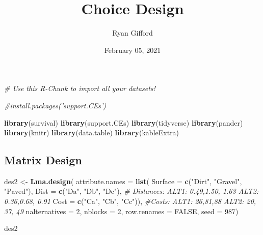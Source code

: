 \documentclass[
]{article}
\title{Choice Design}
\author{Ryan Gifford}
\date{February 05, 2021}
\newenvironment{Shaded}{\begin{snugshade}}{\end{snugshade}}
\newcommand{\CommentTok}[1]{\textcolor[rgb]{0.56,0.35,0.01}{\textit{#1}}}
\newcommand{\DataTypeTok}[1]{\textcolor[rgb]{0.13,0.29,0.53}{#1}}
\newcommand{\DecValTok}[1]{\textcolor[rgb]{0.00,0.00,0.81}{#1}}
\newcommand{\KeywordTok}[1]{\textcolor[rgb]{0.13,0.29,0.53}{\textbf{#1}}}
\newcommand{\NormalTok}[1]{#1}
\newcommand{\OtherTok}[1]{\textcolor[rgb]{0.56,0.35,0.01}{#1}}
\newcommand{\StringTok}[1]{\textcolor[rgb]{0.31,0.60,0.02}{#1}}
\begin{document}
\maketitle

\begin{Shaded}
\begin{Highlighting}[]
\CommentTok{# Use this R-Chunk to import all your datasets!}


\CommentTok{#install.packages('support.CEs')}

\KeywordTok{library}\NormalTok{(survival)}
\KeywordTok{library}\NormalTok{(support.CEs)}
\KeywordTok{library}\NormalTok{(tidyverse)}
\KeywordTok{library}\NormalTok{(pander)}
\KeywordTok{library}\NormalTok{(knitr)}
\KeywordTok{library}\NormalTok{(data.table)}
\KeywordTok{library}\NormalTok{(kableExtra)}
\end{Highlighting}
\end{Shaded}

\hypertarget{matrix-design}{%
\subsection{Matrix Design}\label{matrix-design}}

\begin{Shaded}
\begin{Highlighting}[]
\NormalTok{des2 <-}\StringTok{ }\KeywordTok{Lma.design}\NormalTok{(}
  \DataTypeTok{attribute.names =} \KeywordTok{list}\NormalTok{(}
    \DataTypeTok{Surface =} \KeywordTok{c}\NormalTok{(}\StringTok{"Dirt"}\NormalTok{, }\StringTok{"Gravel"}\NormalTok{, }\StringTok{"Paved"}\NormalTok{),  }
    \DataTypeTok{Dist =} \KeywordTok{c}\NormalTok{(}\StringTok{"Da"}\NormalTok{, }\StringTok{"Db"}\NormalTok{, }\StringTok{"Dc"}\NormalTok{), }\CommentTok{# Distances: ALT1: 0.49,1.50, 1.63  ALT2: 0.36,0.68, 0.91}
    \DataTypeTok{Cost =} \KeywordTok{c}\NormalTok{(}\StringTok{"Ca"}\NormalTok{, }\StringTok{"Cb"}\NormalTok{, }\StringTok{"Cc"}\NormalTok{)), }\CommentTok{#Costs: ALT1: 26,81,88     ALT2: 20, 37, 49}
  \DataTypeTok{nalternatives =} \DecValTok{2}\NormalTok{,}
  \DataTypeTok{nblocks =} \DecValTok{2}\NormalTok{,}
  \DataTypeTok{row.renames =} \OtherTok{FALSE}\NormalTok{,}
  \DataTypeTok{seed =} \DecValTok{987}\NormalTok{)}

\NormalTok{des2}
\end{Highlighting}
\end{Shaded}
\end{document}
